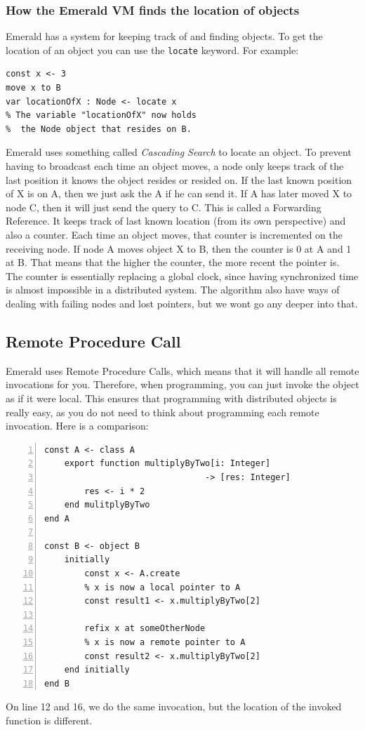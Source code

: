 \subsubsection{How the Emerald VM finds the location of objects}\label{cascading_search}
Emerald has a system for keeping track of and finding objects. To get the location of an object you can use the \verb|locate| keyword. For example:
\begin{lstlisting}[language=emerald]
const x <- 3
move x to B
var locationOfX : Node <- locate x
% The variable "locationOfX" now holds 
%  the Node object that resides on B.
\end{lstlisting}
Emerald uses something called \textit{Cascading Search} to locate an object. To prevent having to broadcast each time an object moves, a node only keeps track of the last position it knows the object resides or resided on. If the last known position of X is on A, then we just ask the A if he can send it. If A has later moved X to node C, then it will just send the query to C. This is called a Forwarding Reference. It keeps track of last known location (from its own perspective) and also a counter. Each time an object moves, that counter is incremented on the receiving node. If node A moves object X to B, then the counter is 0 at A and 1 at B. That means that the higher the counter, the more recent the pointer is. The counter is essentially replacing a global clock, since having synchronized time is almost impossible in a distributed system. The algorithm also have ways of dealing with failing nodes and lost pointers, but we wont go any deeper into that. 


\subsection{Remote Procedure Call}
Emerald uses Remote Procedure Calls, which means that it will handle all remote invocations for you. Therefore, when programming, you can just invoke the object as if it were local. This ensures that programming with distributed objects is really easy, as you do not need to think about programming each remote invocation. Here is a comparison:
\begin{lstlisting}[language=emerald, numbers=left]
const A <- class A
    export function multiplyByTwo[i: Integer] 
                                -> [res: Integer]
        res <- i * 2
    end mulitplyByTwo
end A

const B <- object B
    initially
        const x <- A.create
        % x is now a local pointer to A
        const result1 <- x.multiplyByTwo[2]
        
        refix x at someOtherNode
        % x is now a remote pointer to A
        const result2 <- x.multiplyByTwo[2] 
    end initially
end B
\end{lstlisting}
On line 12 and 16, we do the same invocation, but the location of the invoked function is different.


